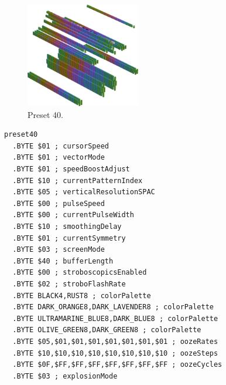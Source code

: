\begin{minipage}[b]{0.48\linewidth}
\begin{figure}[H]                                                          
  \centering                                                             
  \begin{adjustbox}{width=5cm,center}                                   
  \includegraphics[width=5cm]{src/colorspace_presets/preset40-45.png}%
  \end{adjustbox}                                                        
\caption*{Preset 40.}                                           
\end{figure}                                                               
\end{minipage}
\hspace{0.1cm}
\begin{minipage}[b]{0.48\linewidth}                                       
\begin{lstlisting}[basicstyle=\ttfamily\tiny]
preset40
  .BYTE $01 ; cursorSpeed
  .BYTE $01 ; vectorMode
  .BYTE $01 ; speedBoostAdjust
  .BYTE $10 ; currentPatternIndex
  .BYTE $05 ; verticalResolutionSPAC
  .BYTE $00 ; pulseSpeed
  .BYTE $00 ; currentPulseWidth
  .BYTE $10 ; smoothingDelay
  .BYTE $01 ; currentSymmetry
  .BYTE $03 ; screenMode
  .BYTE $40 ; bufferLength
  .BYTE $00 ; stroboscopicsEnabled
  .BYTE $02 ; stroboFlashRate
  .BYTE BLACK4,RUST8 ; colorPalette
  .BYTE DARK_ORANGE8,DARK_LAVENDER8 ; colorPalette
  .BYTE ULTRAMARINE_BLUE8,DARK_BLUE8 ; colorPalette
  .BYTE OLIVE_GREEN8,DARK_GREEN8 ; colorPalette
  .BYTE $05,$01,$01,$01,$01,$01,$01,$01 ; oozeRates
  .BYTE $10,$10,$10,$10,$10,$10,$10,$10 ; oozeSteps
  .BYTE $0F,$FF,$FF,$FF,$FF,$FF,$FF,$FF ; oozeCycles
  .BYTE $03 ; explosionMode
\end{lstlisting}
\end{minipage}

